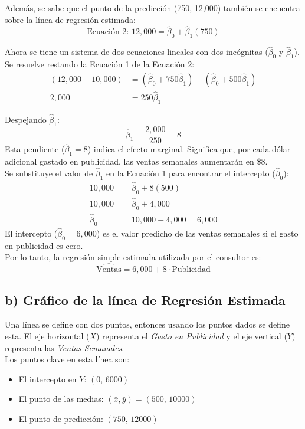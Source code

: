 \documentclass[12pt]{article}
\begin{document}
Además, se sabe que el punto de la predicción (750, 12,000) también se encuentra sobre la línea de regresión estimada:
\begin{equation*}
\text{Ecuación 2: } 12,000 = \hat{\beta}_0 + \hat{\beta}_1(750)
\end{equation*}

Ahora se tiene un sistema de dos ecuaciones lineales con dos incógnitas ($\hat{\beta}_0$ y $\hat{\beta}_1$). Se resuelve restando la Ecuación 1 de la Ecuación 2:
\begin{align*}
(12,000 - 10,000) &= (\hat{\beta}_0 + 750\hat{\beta}_1) - (\hat{\beta}_0 + 500\hat{\beta}_1) \\
2,000 &= 250\hat{\beta}_1
\end{align*}

Despejando $\hat{\beta}_1$:
$$
\hat{\beta}_1 = \frac{2,000}{250} = 8
$$
Esta pendiente ($\hat{\beta}_1 = 8$) indica el efecto marginal. Significa que, por cada dólar adicional gastado en publicidad, las ventas semanales aumentarán en \$8.\\

Se substituye el valor de $\hat{\beta}_1$ en la Ecuación 1 para encontrar el intercepto ($\hat{\beta}_0$):
\begin{align*}
10,000 &= \hat{\beta}_0 + 8(500) \\
10,000 &= \hat{\beta}_0 + 4,000 \\
\hat{\beta}_0 &= 10,000 - 4,000 = 6,000
\end{align*}
El intercepto ($\hat{\beta}_0 = 6,000$) es el valor predicho de las ventas semanales si el gasto en publicidad es cero.\\

Por lo tanto, la regresión simple estimada utilizada por el consultor es:
$$
\hat{\text{Ventas}} = 6,000 + 8 \cdot \text{Publicidad}
$$

\subsection*{b) Gráfico de la línea de Regresión Estimada}

Una línea se define con dos puntos, entonces usando los puntos dados se define esta. 
El eje horizontal ($X$) representa el \emph{Gasto en Publicidad} y el eje vertical ($Y$) representa las \emph{Ventas Semanales}.\\

Los puntos clave en esta línea son:

\begin{itemize}
    \item El intercepto en $Y$: $(0,\,6000)$
    \item El punto de las medias: $(\bar{x},\bar{y}) = (500,\,10000)$
    \item El punto de predicción: $(750,\,12000)$
\end{itemize}
\end{document}
